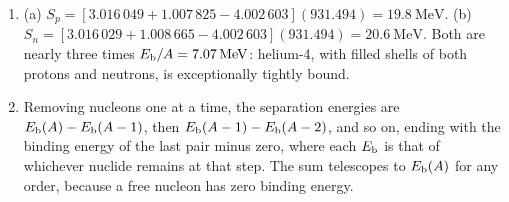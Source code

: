 {\begin{enumerate}[itemsep=2pt]
source left, the core can no longer support itself against gravity and collapses, producing a supernova
and often a neutron star.
\item (a) $S_p=[3.016\,049+1.007\,825-4.002\,603](931.494)=\SI{19.8}{\MeV}$.
\newline (b) $S_n=[3.016\,029+1.008\,665-4.002\,603](931.494)=\SI{20.6}{\MeV}$. Both are nearly three times
$\Eb/A=\SI{7.07}{\MeV}$: helium-4, with filled shells of both protons and neutrons, is exceptionally
tightly bound.
\item Removing nucleons one at a time, the separation energies are $E_{\mathrm{b}}(A)-E_{\mathrm{b}}(A-1)$, then
$E_{\mathrm{b}}(A-1)-E_{\mathrm{b}}(A-2)$, and so on, ending with the binding energy of the last pair minus zero, where each
$E_{\mathrm{b}}$ is that of whichever nuclide remains at that step. The sum telescopes to $E_{\mathrm{b}}(A)$ for any order,
because a free nucleon has zero binding energy.
\end{enumerate}
}
